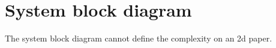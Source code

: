 \section{System block diagram}
The system block diagram cannot define the complexity on an 2d paper.